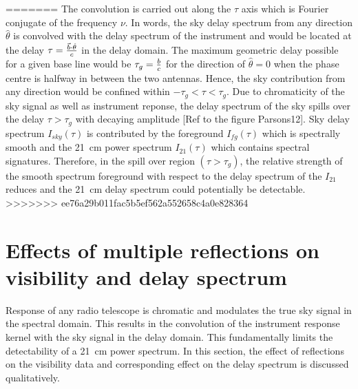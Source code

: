\documentclass[twocolumn]{emulateapj}
\newcommand{\thhat}{{\hat\theta}}
\begin{document}
=======
The convolution is carried out along the $\tau$ axis which is Fourier conjugate of the frequency $\nu$. In words, the sky delay spectrum from any direction $\thhat$ is convolved with the delay spectrum of the instrument and would be located at the delay $\tau = {\vec b \cdot \thhat \over c}$ in the delay domain. The maximum geometric delay possible for a given base line would be $\tau_{g} ={ b \over c }$ for the direction of $\thhat = 0$ when the phase centre is halfway in between the two antennas. Hence, the sky contribution from any direction would be confined within $-\tau_{g}<\tau<\tau_{g}$. Due to chromaticity of the sky signal as well as instrument reponse, the delay spectrum of the sky spills over the delay $\tau> \tau_{g}$ with decaying amplitude [Ref to the figure Parsons12]. Sky delay spectrum $I_{sky}(\tau)$ is contributed by the foreground  $I_{fg}(\tau)$  which is spectrally smooth and the 21~cm power spectrum $I_{21}(\tau)$ which contains spectral signatures. Therefore, in the spill over region $(\tau>\tau_{g})$, the relative strength of the smooth spectrum foreground with respect to the delay spectrum of the $I_{21}$ reduces and the 21~cm delay spectrum could potentially be detectable. 
>>>>>>> ee76a29b011fac5b5ef562a552658c4a0e828364



\section{Effects of multiple reflections on visibility and delay spectrum}
Response of any radio telescope is chromatic and modulates the true sky signal in the spectral domain. This results in the convolution of the instrument response kernel with the sky signal in the delay domain.
This fundamentally limits the detectability of a 21~cm power spectrum. In this section, the effect of reflections on the visibility data and corresponding effect on the delay spectrum is discussed qualitatively.
 
\end{document}
